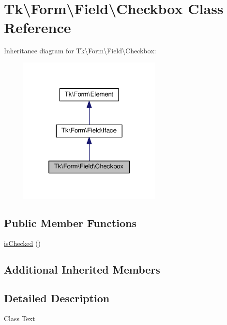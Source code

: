 \hypertarget{classTk_1_1Form_1_1Field_1_1Checkbox}{\section{Tk\textbackslash{}Form\textbackslash{}Field\textbackslash{}Checkbox Class Reference}
\label{classTk_1_1Form_1_1Field_1_1Checkbox}
}


Inheritance diagram for Tk\textbackslash{}Form\textbackslash{}Field\textbackslash{}Checkbox\+:\nopagebreak
\begin{figure}[H]
\begin{center}
\leavevmode
\includegraphics[width=205pt]{classTk_1_1Form_1_1Field_1_1Checkbox__inherit__graph}
\end{center}
\end{figure}
\subsection*{Public Member Functions}
\begin{DoxyCompactItemize}
\item 
\hyperlink{classTk_1_1Form_1_1Field_1_1Checkbox_a6a9f8db23e043e57d5f04cced6a9bfc6}{is\+Checked} ()
\end{DoxyCompactItemize}
\subsection*{Additional Inherited Members}


\subsection{Detailed Description}
Class Text

